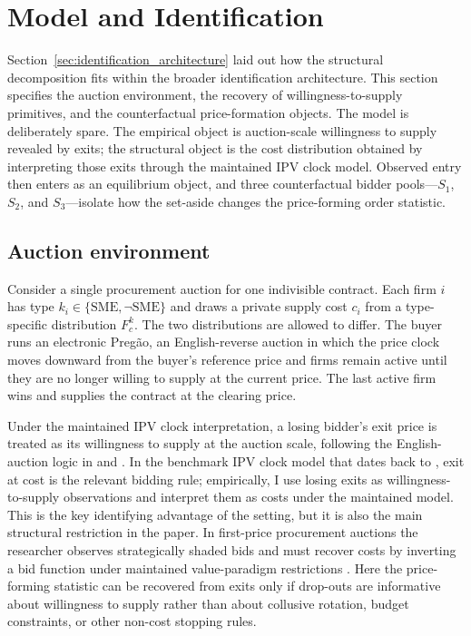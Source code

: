 \section{Model and Identification}\label{sec:model}

Section~\ref{sec:identification_architecture} laid out how the structural
decomposition fits within the broader identification architecture. This
section specifies the auction environment, the recovery of
willingness-to-supply primitives, and the counterfactual price-formation
objects. The model is deliberately spare. The empirical object is
auction-scale willingness to supply revealed by exits; the structural
object is the cost distribution obtained by interpreting those exits
through the maintained IPV clock model. Observed entry then enters as an
equilibrium object, and three counterfactual bidder pools---$S_1$, $S_2$,
and $S_3$---isolate how the set-aside changes the price-forming order
statistic.

\subsection{Auction environment}

Consider a single procurement auction for one indivisible contract. Each firm
$i$ has type $k_i \in \{\mathrm{SME}, \neg\mathrm{SME}\}$ and draws a private
supply cost $c_i$ from a type-specific distribution $F_c^k$. The two
distributions are allowed to differ. The buyer runs an electronic
Preg\~ao, an English-reverse auction in which the price clock moves downward
from the buyer's reference price and firms remain active until they are no
longer willing to supply at the current price. The last active firm wins and
supplies the contract at the clearing price.

Under the maintained IPV clock interpretation, a losing bidder's exit price
is treated as its willingness to supply at the auction scale, following the
English-auction logic in \citet{milgrom1982} and \citet{haile2003}. In the
benchmark IPV clock model that dates back to \citet{vickrey1961}, exit at
cost is the relevant bidding rule; empirically, I use losing exits as
willingness-to-supply observations and interpret them as costs under the
maintained model. This is the key identifying advantage of the setting,
but it is also the main structural restriction in the paper. In
first-price procurement auctions the researcher observes strategically
shaded bids and must recover costs by inverting a bid function under
maintained value-paradigm restrictions
\citep{gpv2000,bajarihortacsu2005}. Here the price-forming
statistic can be recovered from exits only if drop-outs are informative
about willingness to supply rather than about collusive rotation, budget
constraints, or other non-cost stopping rules.

